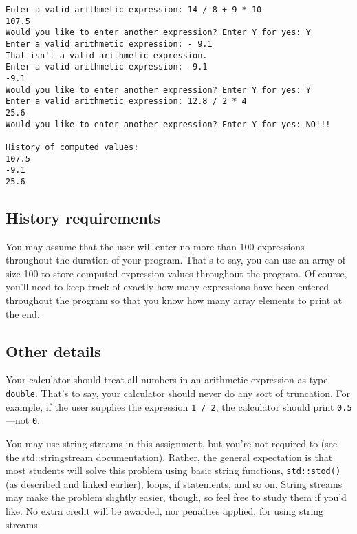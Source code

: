 \documentclass{article}
\newcounter{examplerun}
\newenvironment{examplerun}
    {\begin{tcolorbox}[title=Example Run \refstepcounter{examplerun}\theexamplerun,colframe=black!50!green,colback=white,subtitle style={boxrule=0.4pt,
colback=lightgray!80!green}]}
    {\end{tcolorbox}}
\begin{document}
\begin{examplerun}
    \begin{verbatim}
Enter a valid arithmetic expression: 14 / 8 + 9 * 10
107.5
Would you like to enter another expression? Enter Y for yes: Y
Enter a valid arithmetic expression: - 9.1
That isn't a valid arithmetic expression.
Enter a valid arithmetic expression: -9.1
-9.1
Would you like to enter another expression? Enter Y for yes: Y
Enter a valid arithmetic expression: 12.8 / 2 * 4
25.6
Would you like to enter another expression? Enter Y for yes: NO!!!

History of computed values:
107.5
-9.1
25.6
    \end{verbatim}
\end{examplerun}

\subsection{History requirements}
\label{subsection:history_requirements}

You may assume that the user will enter no more than 100 expressions throughout the duration of your program. That's to say, you can use an array of size 100 to store computed expression values throughout the program. Of course, you'll need to keep track of exactly how many expressions have been entered throughout the program so that you know how many array elements to print at the end.

\subsection{Other details}

Your calculator should treat all numbers in an arithmetic expression as type \texttt{double}. That's to say, your calculator should never do any sort of truncation. For example, if the user supplies the expression \texttt{1 / 2}, the calculator should print \texttt{0.5}---\ul{not} \texttt{0}.

You may use string streams in this assignment, but you're not required to (see the \href{https://cplusplus.com/reference/sstream/stringstream/stringstream/}{std::stringstream} documentation). Rather, the general expectation is that most students will solve this problem using basic string functions, \texttt{std::stod()} (as described and linked earlier), loops, if statements, and so on. String streams may make the problem slightly easier, though, so feel free to study them if you'd like. No extra credit will be awarded, nor penalties applied, for using string streams.
\end{document}
